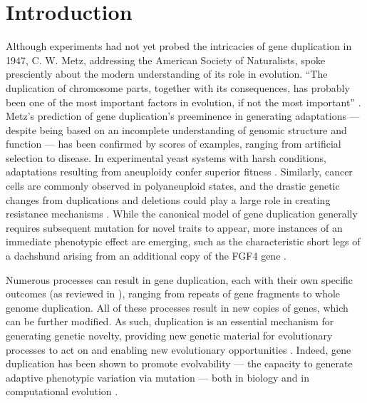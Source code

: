 \section{Introduction} \label{sec:introduction}

Although experiments had not yet probed the intricacies of gene duplication in 1947, C. W. Metz, addressing the American Society of Naturalists, spoke presciently about the modern understanding of its role in evolution.
``The duplication of chromosome parts, together with its consequences, has probably been one of the most important factors in evolution, if not the most important'' \citep{Metz:chromosomeDuplication1947}.
Metz's prediction of gene duplication's preeminence in generating adaptations --- despite being based on an incomplete understanding of genomic structure and function --- has been confirmed by scores of examples, ranging from artificial selection to disease.
In experimental yeast systems with harsh conditions, adaptations resulting from aneuploidy confer superior fitness \citep{Pavelka:2010}.
Similarly, cancer cells are commonly observed in polyaneuploid states, and the drastic genetic changes from duplications and deletions could play a large role in creating resistance mechanisms \citep{polyaneuploidCancer}.
While the canonical model of gene duplication generally requires subsequent mutation for novel traits to appear, more instances of an immediate phenotypic effect are emerging, such as the characteristic short legs of a dachshund arising from an additional copy of the FGF4 gene \citep{ohno1970evolution,dachshundGeneCopyNum}.

Numerous processes can result in gene duplication, each with their own specific outcomes (as reviewed in \citep{Zhang:2003fw}), ranging from repeats of gene fragments to whole genome duplication.
All of these processes result in new copies of genes, which can be further modified.
As such, duplication is an essential mechanism for generating genetic novelty, providing new genetic material for evolutionary processes to act on and enabling new evolutionary opportunities \citep{Zhang:2003fw,Crow:2006role,Magadum:2013wu}.
Indeed, gene duplication has been shown to promote evolvability --- the capacity to generate adaptive phenotypic variation via mutation --- both in biology and in computational evolution \citep{Hu:2010ea}.

